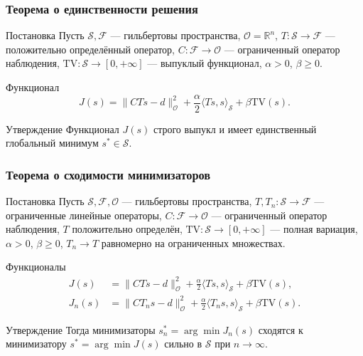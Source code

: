 \documentclass{beamer}
\begin{document}
\begin{frame}
\frametitle{Теорема о единственности решения}

\begin{block}{Постановка}
Пусть $\mathcal{S}, \mathcal{F}$ --- гильбертовы пространства, $\mathcal{O} = \mathbb{R}^n$, $T: \mathcal{S} \to \mathcal{F}$ --- положительно определённый оператор, $C: \mathcal{F} \to \mathcal{O}$ --- ограниченный оператор наблюдения, $\mathrm{TV}: \mathcal{S} \to [0,+\infty]$ --- выпуклый функционал, $\alpha > 0$, $\beta \geq 0$.
\end{block}

\begin{block}{Функционал}
\begin{equation}
    J(s) = \|C T s - d\|_{\mathcal{O}}^2 + \frac{\alpha}{2} \langle T s, s \rangle_{\mathcal{S}} + \beta \mathrm{TV}(s).
\end{equation}
\end{block}

\begin{block}{Утверждение}
Функционал $J(s)$ строго выпукл и имеет единственный глобальный минимум $s^* \in \mathcal{S}$.
\end{block}

\end{frame}

\begin{frame}
\frametitle{Теорема о сходимости минимизаторов}

\begin{block}{Постановка}
Пусть $\mathcal{S}, \mathcal{F}, \mathcal{O}$ --- гильбертовы пространства, 
$T, T_n: \mathcal{S} \to \mathcal{F}$ --- ограниченные линейные операторы, 
$C: \mathcal{F} \to \mathcal{O}$ --- ограниченный оператор наблюдения, 
$T$ положительно определён, $\mathrm{TV}: \mathcal{S} \to [0,+\infty]$ --- полная вариация, 
$\alpha > 0$, $\beta \geq 0$,
$T_n \to T$ равномерно на ограниченных множествах.
\end{block}

\begin{block}{Функционалы}
\begin{align}
    J(s) &= \|C T s - d\|_{\mathcal{O}}^2 + \frac{\alpha}{2} \langle T s, s \rangle_{\mathcal{S}} + \beta \mathrm{TV}(s), \\
    J_n(s) &= \|C T_n s - d\|_{\mathcal{O}}^2 + \frac{\alpha}{2} \langle T_n s, s \rangle_{\mathcal{S}} + \beta \mathrm{TV}(s).
\end{align}
\end{block}

\begin{block}{Утверждение}
Тогда минимизаторы $s_n^* = \arg\min J_n(s)$ сходятся к минимизатору $s^* = \arg\min J(s)$ сильно в $\mathcal{S}$ при $n \to \infty$.
\end{block}

\end{frame}
\end{document}
